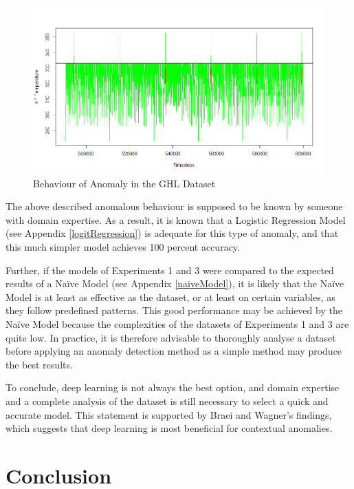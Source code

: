 \begin{figure}[h]
	\centering
	\includegraphics[scale=0.45]{Figures/review}
	\decoRule
	\caption[Behaviour of Anomaly in the GHL Dataset]{Behaviour of Anomaly in the GHL Dataset \parencite{own}}
	\label{fig:review}
\end{figure}

The above described anomalous behaviour is supposed to be known by someone with domain expertise. As a result, it is known that a Logistic Regression Model (see Appendix \ref{logitRegression}) is adequate for this type of anomaly, and that this much simpler model achieves 100 percent accuracy. 

Further, if the models of Experiments 1 and 3 were compared to the expected results of a Naïve Model (see Appendix \ref{naiveModel}), it is likely that the Naïve Model is at least as effective as the dataset, or at least on certain variables, as they follow predefined patterns. This good performance may be achieved by the Naïve Model because the complexities of the datasets of Experiments 1 and 3 are quite low. In practice, it is therefore advisable to thoroughly analyse a dataset before applying an anomaly detection method as a simple method may produce the best results.    

To conclude, deep learning is not always the best option, and domain expertise and a complete analysis of the dataset is still necessary to select a quick and accurate model. This statement is supported by Braei and Wagner's \parencite*{Braei2020} findings, which suggests that deep learning is most beneficial for contextual anomalies.   

\chapter{Conclusion}

